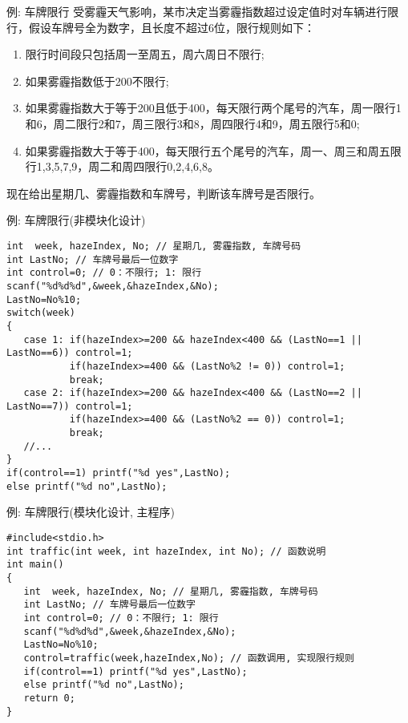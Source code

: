 \begin{frame}{例: 车牌限行}
受雾霾天气影响，某市决定当雾霾指数超过设定值时对车辆进行限行，假设车牌号全为数字，且长度不超过6位，限行规则如下：
\begin{enumerate}
	\item 限行时间段只包括周一至周五，周六周日不限行; 
	\item 如果雾霾指数低于200不限行;
	\item 如果雾霾指数大于等于200且低于400，每天限行两个尾号的汽车，周一限行1和6，周二限行2和7，周三限行3和8，周四限行4和9，周五限行5和0;
	\item 如果雾霾指数大于等于400，每天限行五个尾号的汽车，周一、周三和周五限行1,3,5,7,9，周二和周四限行0,2,4,6,8。 
\end{enumerate} 
现在给出星期几、雾霾指数和车牌号，判断该车牌号是否限行。 
\end{frame}

\begin{frame}{例: 车牌限行(非模块化设计)}
\begin{lstlisting}
int  week, hazeIndex, No; // 星期几, 雾霾指数, 车牌号码
int LastNo; // 车牌号最后一位数字
int control=0; // 0：不限行; 1: 限行 
scanf("%d%d%d",&week,&hazeIndex,&No);
LastNo=No%10; 
switch(week)
{
   case 1: if(hazeIndex>=200 && hazeIndex<400 && (LastNo==1 || LastNo==6)) control=1;
           if(hazeIndex>=400 && (LastNo%2 != 0)) control=1;  
           break; 
   case 2: if(hazeIndex>=200 && hazeIndex<400 && (LastNo==2 || LastNo==7)) control=1;
           if(hazeIndex>=400 && (LastNo%2 == 0)) control=1; 
           break;
   //...
} 
if(control==1) printf("%d yes",LastNo);
else printf("%d no",LastNo);
\end{lstlisting}
\end{frame}

\begin{frame}{例: 车牌限行(模块化设计, 主程序)}
\begin{lstlisting}
#include<stdio.h>
int traffic(int week, int hazeIndex, int No); // 函数说明
int main()
{
   int  week, hazeIndex, No; // 星期几, 雾霾指数, 车牌号码
   int LastNo; // 车牌号最后一位数字
   int control=0; // 0：不限行; 1: 限行 
   scanf("%d%d%d",&week,&hazeIndex,&No);
   LastNo=No%10; 
   control=traffic(week,hazeIndex,No); // 函数调用, 实现限行规则
   if(control==1) printf("%d yes",LastNo);
   else printf("%d no",LastNo);
   return 0;
}
\end{lstlisting}
\end{frame}

